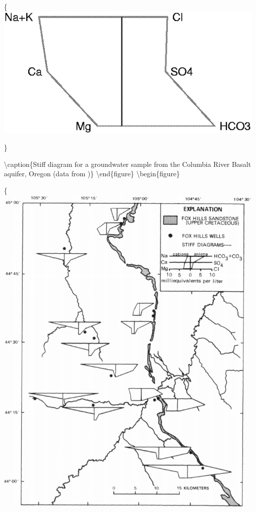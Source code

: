 \documentclass[]{book}
\begin{document}
\{\centering \includegraphics[width=10.72in]{figures/2_31}

\}

\textbackslash{}caption\{Stiff diagram for a groundwater sample from the Columbia River Basalt aquifer, Oregon (data from \citet{miller_oregon_1984})\}\label{fig:fig-2-31}
\textbackslash{}end\{figure\}
\textbackslash{}begin\{figure\}

\{\centering \includegraphics[width=9.96in]{figures/2_32}
\end{document}
